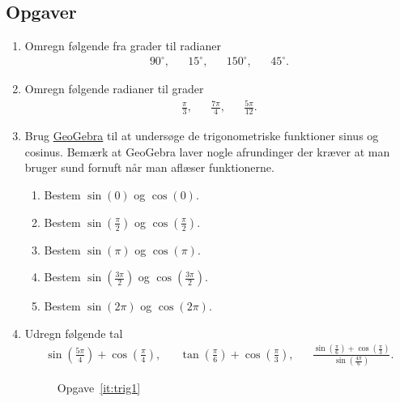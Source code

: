 \subsection{Opgaver}

\begin{enumerate}
	\item Omregn følgende fra grader til radianer
	\begin{align*}
	90^\circ,&& 15^\circ,&&150^\circ,&& 45^\circ.
	\end{align*}
	
	\item Omregn følgende radianer til grader
	\begin{align*}
	\frac{\pi}{3},&&\frac{7\pi}{4},&& \frac{5\pi}{12}.
	\end{align*}
	

	
		\item Brug \href{https://www.geogebra.org/m/e2vTM4Ut}{GeoGebra} til at undersøge de trigonometriske funktioner sinus og cosinus. Bemærk at GeoGebra laver nogle afrundinger der kræver at man bruger sund fornuft når man aflæser funktionerne.
	\begin{enumerate}
		\item Bestem $\sin(0)$ og $\cos(0)$.
		\item Bestem $\sin(\frac{\pi}{2})$ og $ \cos(\frac{\pi}{2}) $.
		\item Bestem $\sin(\pi)$ og $\cos(\pi)$.
		\item Bestem $\sin(\frac{3\pi}{2}) $ og $\cos(\frac{3\pi}{2})$.
		\item Bestem $\sin(2\pi)$ og $ \cos(2\pi) $.
	\end{enumerate}
	
	 \item Udregn følgende tal
	\begin{align*}
	\sin(\frac{5\pi}{4})+\cos(\frac{\pi}{4}),&& \tan(\frac{\pi}{6})+\cos(\frac{\pi}{3}),&& \frac{\sin(\frac{\pi}{6})+\cos(\frac{\pi}{3})}{\sin(\frac{4\pi}{6})}.
	\end{align*}
	
	\begin{figure}
		\centering
		\caption{Opgave~\ref{it:trig1}}
		\label{fig:trig1}
	\end{figure}
	


\end{enumerate}
